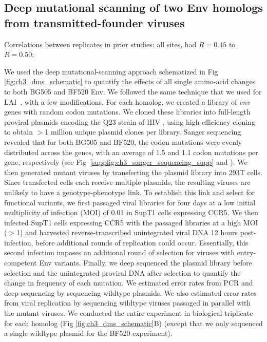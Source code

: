 \documentclass[9pt]{elife}
\begin{document}
\subsection*{Deep mutational scanning of two Env homologs from transmitted-founder viruses}

Correlations between replicates in prior studies:
\citet{haddox2016experimental} all sites, had $R = 0.45$ to $R = 0.50$;


We used the deep mutational-scanning approach schematized in Fig \ref{fig:ch3_dms_schematic} to quantify the effects of all single amino-acid changes to both BG505 and BF520 Env.
We followed the same technique that we used for LAI~\cite{haddox2016experimental}, with a few modifications.
For each homolog, we created a library of \textit{env} genes with random codon mutations.
We cloned these libraries into full-length proviral plasmids encoding the Q23 strain of HIV \cite{poss1999variants}, using high-efficiency cloning to obtain $>$1 million unique plasmid clones per library.
Sanger sequencing revealed that for both BG505 and BF520, the codon mutations were evenly distributed across the genes, with an average of 1.5 and 1.1 codon mutations per gene, respectively (see Fig~\ref{suppfig:ch3_sanger_sequencing_supp} and \cite{dingens2017comprehensive}).
We then generated mutant viruses by transfecting the plasmid library into 293T cells.
Since transfected cells each receive multiple plasmids, the resulting viruses are unlikely to have a genotype-phenotype link.
To establish this link and select for functional variants, we first passaged viral libraries for four days at a low initial multiplicity of infection (MOI) of 0.01 in SupT1 cells expressing CCR5.
We then infected SupT1 cells expressing CCR5 with the passaged libraries at a high MOI ($>$1) and harvested reverse-transcribed unintegrated viral DNA 12 hours post-infection, before additional rounds of replication could occur.
Essentially, this second infection imposes an additional round of selection for viruses with entry-competent Env variants.
Finally, we deep sequenced the plasmid library before selection and the unintegrated proviral DNA after selection to quantify the change in frequency of each mutation.
We estimated error rates from PCR and deep sequencing by sequencing wildtype plasmids.
We also estimated error rates from viral replication by sequencing wildtype viruses passaged in parallel with the mutant viruses.
We conducted the entire experiment in biological triplicate for each homolog (Fig \ref{fig:ch3_dms_schematic}B) (except that we only sequenced a single wildtype plasmid for the BF520 experiment).
\end{document}
